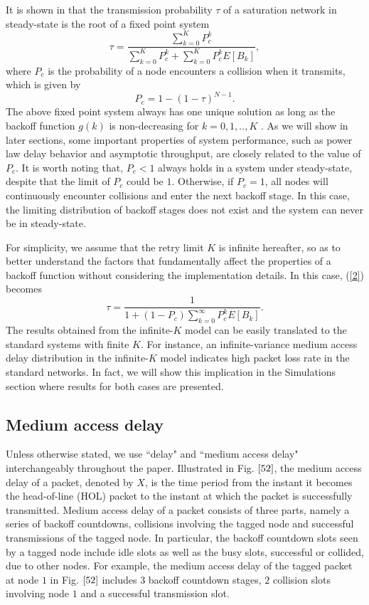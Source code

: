 \documentclass[journal]{IEEEtran}
\begin{document}
It is shown in \cite{2005:Bianchi} that the transmission probability $\tau$ of a saturation network in steady-state is the root of a fixed point system
\begin{equation}
\label{2}
\tau=\frac{\sum_{k=0}^K P_c^k}{\sum_{k=0}^K P_c^k+\sum_{k=0}^K P_c^kE[B_k]},
\end{equation}
where $P_c$ is the probability of a node encounters a collision when it transmits, which is given by
\begin{equation}
\label{1}
P_c=1-(1-\tau)^{N-1}.
\end{equation}
The above fixed point system always has one unique solution as long as the backoff function $g(k)$ is non-decreasing for $k=0,1,..,K$ \cite{2007:Kumar}. As we will show in later sections, some important properties of system performance, such as power law delay behavior and asymptotic throughput, are closely related to the value of $P_c$. It is worth noting that, $P_c<1$ always holds in a system under steady-state, despite that the limit of $P_c$ could be $1$. Otherwise, if $P_c=1$, all nodes will continuously encounter collisions and enter the next backoff stage. In this case, the limiting distribution of backoff stages does not exist and the system can never be in steady-state.

For simplicity, we assume that the retry limit $K$ is infinite hereafter, so as to better understand the factors that fundamentally affect the properties of a backoff function without considering the implementation details. In this case, (\ref{2}) becomes
\begin{equation}
\label{3}
\tau=\frac{1}{1+\left(1-P_c\right)\sum_{k=0}^{\infty}P_c^k E[B_k]}.
\end{equation}
The results obtained from the infinite-$K$ model can be easily translated to the standard systems with finite $K$. For instance, an infinite-variance medium access delay distribution in the infinite-$K$ model indicates high packet loss rate in the standard networks. In fact, we will show this implication in the Simulations section where results for both cases are presented.

\subsection{Medium access delay}
Unless otherwise stated, we use ``delay" and ``medium access delay" interchangeably throughout the paper. Illustrated in Fig. $\ref{52}$, the medium access delay of a packet, denoted by $X$, is the time period from the instant it becomes the head-of-line (HOL) packet to the instant at which the packet is successfully transmitted. Medium access delay of a packet consists of three parts, namely a series of backoff countdowns, collisions involving the tagged node and successful transmissions of the tagged node\cite{2010:Zhang}. In particular, the backoff countdown slots seen by a tagged node include idle slots as well as the busy slots, successful or collided, due to other nodes. For example, the medium access delay of the tagged packet at node $1$ in Fig. $\ref{52}$ includes $3$ backoff countdown stages, $2$ collision slots involving node $1$ and a successful transmission slot.
\end{document}
